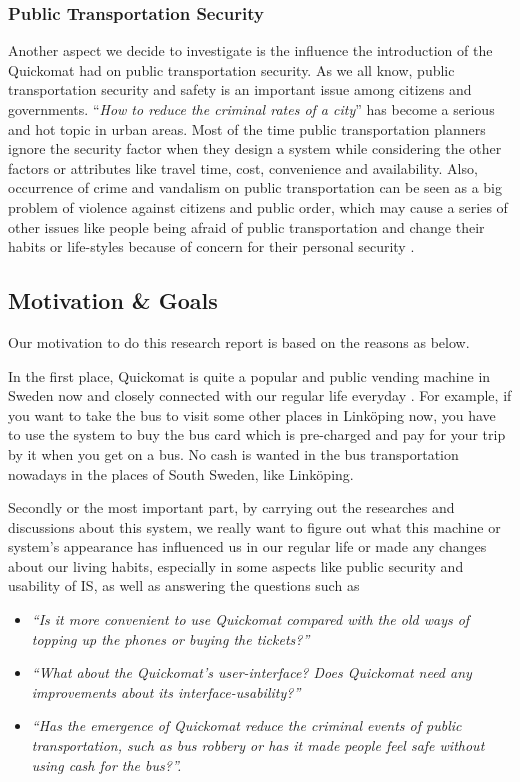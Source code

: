 \documentclass[twocolumn]{article}
\begin{document}
\subsubsection{Public Transportation Security}
Another aspect we decide to investigate is the influence the introduction of the Quickomat had on public transportation security. As we all know, public transportation security and safety is an important issue among citizens and governments. “\emph{How to reduce the criminal rates of a city}” has become a serious and hot topic in urban areas. Most of the time public transportation planners ignore the security factor when they design a system while considering the other factors or attributes like travel time, cost, convenience and availability.  Also, occurrence of crime and vandalism on public transportation can be seen as a big problem of violence against citizens and public order, which may cause a series of other issues like people being afraid of public transportation and change their habits or life-styles because of concern for their personal security \citep{Hoel1992}.

\subsection{Motivation \& Goals}
Our motivation to do this research report is based on the reasons as below.

In the first place, Quickomat is quite a popular and public vending machine in Sweden now and closely connected with our regular life everyday \citep{Svanberg2012}. For example, if you want to take the bus to visit some other places in Linköping now, you have to use the system to buy the bus card which is pre-charged and pay for your trip by it when you get on a bus. No cash is wanted in the bus transportation nowadays in the places of South Sweden, like Linköping.

Secondly or the most important part, by carrying out the researches and discussions about this system, we really want to figure out what this machine or system’s appearance has influenced us in our regular life or made any changes about our living habits, especially in some aspects like public security and usability of IS, as well as answering the questions such as
\begin{itemize}
  \item \emph{“Is it more convenient to use Quickomat compared with the old ways of topping up the phones or buying the tickets?”}
  \item \emph{“What about the Quickomat's user-interface? Does Quickomat need any improvements  about its interface-usability?”}
  \item \emph{“Has the emergence of Quickomat reduce the criminal events of public transportation, such as bus robbery or has it made people feel safe without using cash for the bus?”.}
\end{itemize}
\end{document}
